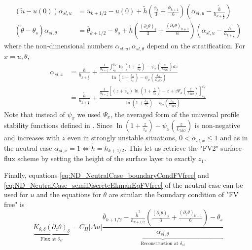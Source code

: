\begin{equation}
\begin{aligned}
\label{eq:ND_StratifiedCase_relation_tilde_bar}
	\left(\widetilde{u} - u(0)\right)\alpha_{sl, u}
	&= \overline{u}_{k+1/2} - u(0) + \widetilde{h}
	\left(\frac{\phi_\delta}{3} + \frac{\phi_{k+1}}{6}\right)
	\left(\alpha_{sl, u} -
	\frac{\widetilde{h}}{h_{k+\frac{1}{2}}}
	\right)\\
	\left(\widetilde{\theta} - \theta_s\right)
	\alpha_{sl, \theta}
	&= \overline{\theta}_{k+1/2} - \theta_s +
	\widetilde{h}\left(
		\frac{{(\partial_z \theta)}_\delta}{3} +
		\frac{{(\partial_z \theta)}_{k+1}}{6}
	\right)\left(\alpha_{sl, u} -
	\frac{\widetilde{h}}{h_{k+\frac{1}{2}}}
	\right)
\end{aligned}
\end{equation}
where the non-dimensional numbers $\alpha_{sl, u},
\alpha_{sl, \theta}$ depend on the stratification. For $x=u, \theta$,
\begin{equation}
	\begin{aligned}
	\alpha_{sl, x} &= \frac{\widetilde{h}}{h_{k+\frac{1}{2}}} +
	\frac{\frac{1}{h_{k+\frac{1}{2}}}\int_{z_k}^{\delta_{sl}}
	\ln(1+\frac{z}{z_{x}})- \psi_x\left(\frac{z}{L_{MO}}\right)
	dz}{\ln(1+\frac{\delta_{sl}}{z_{x}})- \psi_x\left(\frac{\delta_{sl}}{L_{MO}}\right)
    } \\
		&=\frac{\widetilde{h}}{h_{k+\frac{1}{2}}} +
 \frac{\frac{1}{{h_{k+\frac{1}{2}}}}
    \left[
	    (z+z_{x})\ln(1+\frac{z}{z_{x}})-z
    +
    z \Psi_x\left(\frac{z}{L_{MO}}\right) \right]_{z_k}^{\delta_{sl}}
    }{\ln(1+\frac{\delta_{sl}}{z_{x}})- \psi_x\left(\frac{\delta_{sl}}{L_{MO}}\right)
    }
\end{aligned}
\end{equation}
Note that instead of $\psi_x$ we used $\Psi_x$,
the averaged form of the universal
profile stability functions defined in \citep{nishizawa_surface_2018}.
%
Since $\ln(1+\frac{z}{z_{x}})-
\psi_x(\frac{z}{L_{MO}})$ is non-negative and increases with $z$ even
in strongly unstable situations,
$0 < \alpha_{sl, x} \leq 1$ and as in the neutral case
$\alpha_{sl, x}=1 \iff \widetilde{h}=h_{k+1/2}$. This let us retrieve
the "FV2" surface flux scheme by setting the height of the surface
layer to exactly $z_1$.
\par
Finally, equations \eqref{eq:ND_NeutralCase_boundaryCondFVfree} and
\eqref{eq:ND_NeutralCase_semiDiscreteEkmanEqFVfree} of the
neutral case can be used for
$u$ and the equations for $\theta$ are similar:
the boundary condition of "FV free" is
\begin{equation}
	\label{eq:ND_StratifiedCase_semiDiscreteEkmanEqFVfree}
	\underbrace{K_{\theta, \delta} (\partial_z \theta)_\delta}_{
		\text{Flux at } \delta_{sl}
	} = 
	C_H|\Delta u|\underbrace{
	\frac{
  \overline{\theta}_{k+1/2} - \frac{\widetilde{h}^2}{h_{k+1/2}}
	(\frac{{(\partial_z \theta)}_k}{3} +
	\frac{{(\partial_z \theta)}_{k+1}}{6}) 
  - \theta_s
}{\alpha_{sl, \theta}}
	}_{\text{Reconstruction at } \delta_{sl}}
\end{equation}

